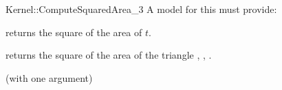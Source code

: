 \begin{ccRefFunctionObjectConcept}{Kernel::ComputeSquaredArea_3}
A model for this must provide:


       {returns the square of the area of $t$. }

{returns the square of the area of the triangle , , . }

\ccRefines
{} (with one argument)

\ccSeeAlso
{}\\

\end{ccRefFunctionObjectConcept}
